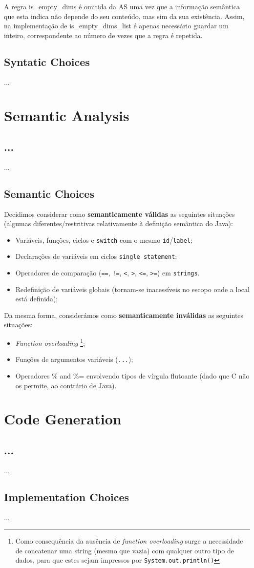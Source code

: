 \documentclass[a4paper]{article}
\begin{document}
A regra is\_empty\_dims é omitida da AS uma vez que a informação semântica que esta indica não depende do seu conteúdo, mas sim da sua existência.
Assim, na implementação de is\_empty\_dims\_list é apenas necessário guardar um inteiro, correspondente ao número de vezes que a regra é repetida.

\subsection{Syntatic Choices}
\indent \indent ...

\cleardoublepage

\section{Semantic Analysis}
\subsection{...}
\indent \indent ...

\subsection{Semantic Choices}
\indent \indent Decidimos considerar como \textbf{semanticamente válidas} as seguintes situações (algumas diferentes/restritivas relativamente à definição semântica do Java):
\begin{itemize}
	\item Variáveis, funções, ciclos e \texttt{switch} com o mesmo \texttt{id}/\texttt{label};
	\item Declarações de variáveis em ciclos \texttt{single statement};
	\item Operadores de comparação (\texttt{==}, \texttt{!=}, \texttt{<}, \texttt{>}, \texttt{<=}, \texttt{>=}) em \texttt{strings}.
	\item Redefinição de variáveis globais (tornam-se inacessíveis no escopo onde a local está definida);
\end{itemize}

Da mesma forma, considerámos como \textbf{semanticamente inválidas} as seguintes situações:
\begin{itemize}
	\item \textit{Function overloading} \footnote[1]{Como consequência da ausência de \textit{function overloading} surge a necessidade de concatenar
		uma string (mesmo que vazia) com qualquer outro tipo de dados, para que estes sejam impressos por \texttt{System.out.println()}};
	\item Funções de argumentos variáveis (\texttt{...});
	\item Operadores \% and \%= envolvendo tipos de vírgula flutoante (dado que C não os permite, ao contrário de Java).
\end{itemize}

\cleardoublepage

\section{Code Generation}
\subsection{...}
\indent \indent ...

\subsection{Implementation Choices}
\indent \indent ...
\end{document}
